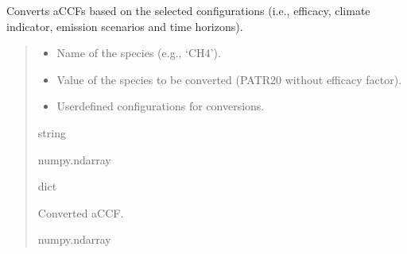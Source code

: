 \documentclass[a4paper,11pt,english]{sphinxmanual}
\begin{document}
\begin{fulllineitems}
\label{\detokenize{modules:climaccf.accf.convert_accf}}
\pysigstartsignatures
{}
\pysigstopsignatures
\sphinxAtStartPar
Converts aCCFs based on the selected configurations (i.e., efficacy, climate indicator, emission scenarios and time horizons).
\begin{quote}\begin{description}
\begin{itemize}
\item {} 
\sphinxAtStartPar
{} \textendash{} Name of the species (e.g., ‘CH4’).

\item {} 
\sphinxAtStartPar
{} \textendash{} Value of the species to be converted (P\sphinxhyphen{}ATR20 without efficacy factor).

\item {} 
\sphinxAtStartPar
{} \textendash{} User\sphinxhyphen{}defined configurations for conversions.

\end{itemize}

\sphinxAtStartPar
string

\sphinxAtStartPar
numpy.ndarray

\sphinxAtStartPar
dict

\sphinxAtStartPar
Converted aCCF.

\sphinxAtStartPar
numpy.ndarray

\end{description}\end{quote}

\end{fulllineitems}

\end{document}
